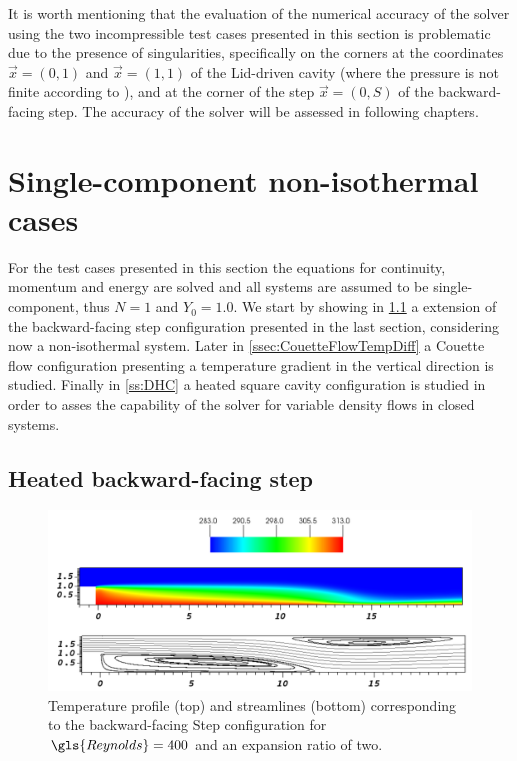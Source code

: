 It is worth mentioning that the evaluation of the numerical accuracy of the solver using the two incompressible test cases presented in this section is problematic due to the presence of singularities, specifically on the corners at the coordinates $ \vec{x} = (0,1)$ and $\vec{x} =(1,1)$ of the Lid-driven cavity (where the pressure is not finite according to \cite{botellaBenchmarkSpectralResults1998}), and at the corner of the step $\vec{x} = (0,S)$ of the backward-facing step. The accuracy of the solver will be assessed in following chapters.


\section{Single-component non-isothermal cases} \label{sec:SinCompNonIsothermCase}
For the test cases presented in this section the equations for continuity, momentum and energy are solved and all systems are assumed to be single-component, thus $N = 1$ and $Y_0 = 1.0$. We start by showing in \cref{ssec:HeatedBackwardFacingStep} a extension of the backward-facing step configuration presented in the last section, considering now a non-isothermal system. Later in \cref{ssec:CouetteFlowTempDiff} a Couette flow configuration presenting a temperature gradient in the vertical direction is studied. Finally in \cref{ss:DHC} a heated square cavity configuration is studied in order to asses the capability of the solver for variable density flows in closed systems.


\subsection{Heated backward-facing step}\label{ssec:HeatedBackwardFacingStep}
\begin{figure}[tb]
	\begin{center}
		\includegraphics[width=\linewidth]{../plots/HBFS_TemperatureRe700_2.pdf}
		\caption{Temperature profile (top) and streamlines (bottom) corresponding to the backward-facing Step configuration for $\gls{Reynolds} = 400$ and an expansion ratio of two.}
		\label{BFS_Streamlines}
	\end{center}
\end{figure}

